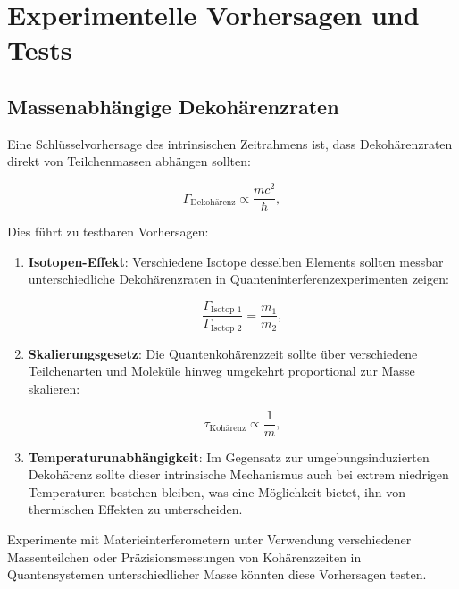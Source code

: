 \documentclass[12pt,a4paper]{article}
\begin{document}
	\section{Experimentelle Vorhersagen und Tests}
	\label{sec:experimental}
	
	\subsection{Massenabhängige Dekohärenzraten}
	\label{subsec:mass_dependent_decoherence}
	
	Eine Schlüsselvorhersage des intrinsischen Zeitrahmens ist, dass Dekohärenzraten direkt von Teilchenmassen abhängen sollten:
	
	\begin{equation}
		\Gamma_{\text{Dekohärenz}} \propto \frac{m c^2}{\hbar},
		\label{eq:decoherence_mass}
	\end{equation}
	
	Dies führt zu testbaren Vorhersagen:
	
	\begin{enumerate}
		\item \textbf{Isotopen-Effekt}: Verschiedene Isotope desselben Elements sollten messbar unterschiedliche Dekohärenzraten in Quanteninterferenzexperimenten zeigen:
		
		\begin{equation}
			\frac{\Gamma_{\text{Isotop 1}}}{\Gamma_{\text{Isotop 2}}} = \frac{m_1}{m_2},
			\label{eq:isotope_ratio}
		\end{equation}
		
		\item \textbf{Skalierungsgesetz}: Die Quantenkohärenzzeit sollte über verschiedene Teilchenarten und Moleküle hinweg umgekehrt proportional zur Masse skalieren:
		
		\begin{equation}
			\tau_{\text{Kohärenz}} \propto \frac{1}{m},
			\label{eq:coherence_scaling}
		\end{equation}
		
		\item \textbf{Temperaturunabhängigkeit}: Im Gegensatz zur umgebungsinduzierten Dekohärenz sollte dieser intrinsische Mechanismus auch bei extrem niedrigen Temperaturen bestehen bleiben, was eine Möglichkeit bietet, ihn von thermischen Effekten zu unterscheiden.
	\end{enumerate}
	
	Experimente mit Materieinterferometern unter Verwendung verschiedener Massenteilchen \cite{Arndt1999, Hornberger2012, Fein2019} oder Präzisionsmessungen von Kohärenzzeiten in Quantensystemen unterschiedlicher Masse könnten diese Vorhersagen testen.
	
\end{document}
